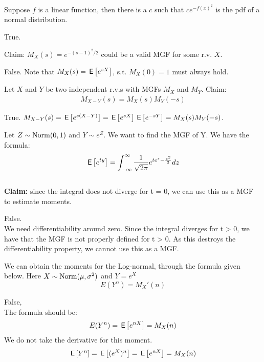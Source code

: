 \documentclass[tf-tutorial-all.tex]{subfiles}
\begin{document}
\begin{truefalse}
Suppose $f$ is a linear function, then there is a $c$ such that $c
e^{-f(x)^2}$ is the pdf of a normal distribution.
\begin{solution}
  True.
\end{solution}
\end{truefalse}


\begin{truefalse}
Claim: $M_X(s)=e^{-(s-1)^2/2}$ could be a valid MGF for some r.v. $X$.
\begin{solution}
False. Note that $M_X(s)=\,\mathsf{E}\left[e^{sX}\right]$, s.t. $M_X(0)=1$ must always hold.
\end{solution}
\end{truefalse}


\begin{truefalse}
Let $X$ and $Y$ be two independent r.v.s with MGFs $M_X$ and $M_Y$. Claim:
\begin{align}
\label{eq:2}
M_{X-Y}(s)=M_X(s)M_Y(-s)
\end{align}
\begin{solution}
True. $M_{X-Y}(s)=\,\mathsf{E}\left[e^{s(X-Y)}\right]=\,\mathsf{E}\left[e^{sX}\right]\,\mathsf{E}\left[e^{-sY}\right]=M_X(s)M_Y(-s)$.
\end{solution}
\end{truefalse}

\begin{truefalse}
Let $Z \sim \mathrm{Norm}(0,1)$ and $Y \sim e^{Z}$. We want to find the MGF of Y.
We have the formula:
$$\,\mathsf{E}\left[e^{ty}\right] = \int^{\infty}_{-\infty} \frac{1}{\sqrt{2 \pi}} e^{t e^{z} - \frac{z^{2}}{2}} dz$$
\\ \textbf{Claim: } since the integral does not diverge for t = 0, we can use this as a MGF to estimate moments. 
\begin{solution}
    False.
    \\We need differentiability around zero. Since the integral diverges for t > 0, we have that the MGF is not properly defined for t > 0. As this destroys the differentiability property, we cannot use this as a MGF. 
\end{solution}
\end{truefalse}

\begin{truefalse}
We can obtain the moments for the Log-normal, through the formula given below.
Here $X \sim \mathrm{Norm}(\mu, \sigma^{2})$ and $Y = e^{X}$
$$E(Y^{n}) =  M_{X}'(n) $$
    \begin{solution}
        False, 
        \\The formula should be:
        $$E(Y^{n}) = \,\mathsf{E}\left[e^{n X}\right] = M_{X}(n) $$
        We do not take the derivative for this moment. 
        $$\,\mathsf{E}\left[Y^{n}\right] = \,\mathsf{E}\left[(e^{X}) ^{n}\right] = \,\mathsf{E}\left[e^{nX}\right] = M_{X}(n)$$
    \end{solution}
\end{truefalse}
\end{document}
